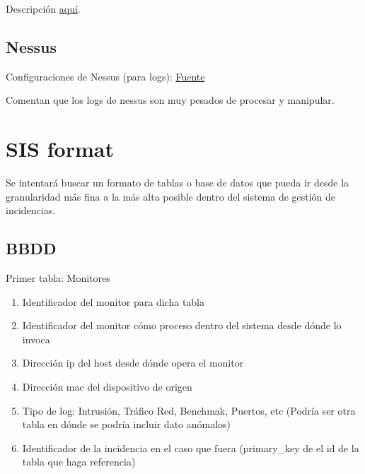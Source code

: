 \documentclass[a4paper,12pt]{article}
\begin{document}
Descripción \href{https://www.manageengine.com/network-monitoring/what-is-snmp.html}{aquí}.

\subsection{Nessus}

Configuraciones de Nessus (para logs): \href{http://wiki.networksecuritytoolkit.org/nstwiki/index.php/Nessus}{Fuente}

Comentan que los logs de nessus son muy pesados de procesar y manipular.

\section{SIS format}

Se intentará buscar un formato de tablas o base de datos que pueda ir desde la granularidad más fina a la más alta posible dentro del sistema de gestión de incidencias.

\subsection{BBDD}

Primer tabla: Monitores \\


\begin{enumerate}
\item Identificador del monitor para dicha tabla
\item Identificador del monitor cómo proceso dentro del sistema desde dónde lo invoca
\item Dirección ip del host desde dónde opera el monitor
\item Dirección mac del dispositivo de origen
\item Tipo de log: Intrusión, Tráfico Red, Benchmak, Puertos, etc (Podría ser otra tabla en dónde se podría incluir dato anómalos)
\item Identificador de la incidencia en el caso que fuera (primary\_key de el id de la tabla que haga referencia)
\end{enumerate}
\end{document}
